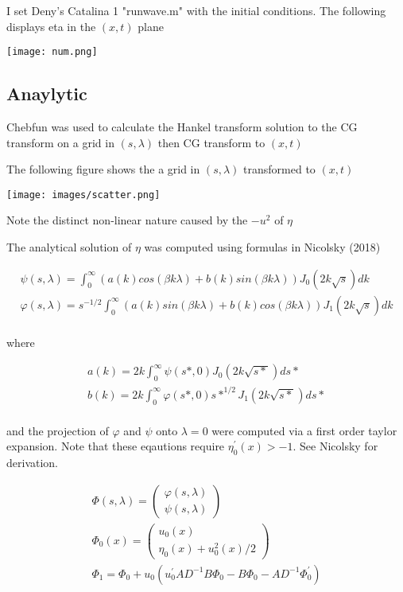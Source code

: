 \documentclass{article}
\begin{document}
I set Deny's Catalina 1 "runwave.m" with the initial conditions. The following displays eta in the $(x,t)$ plane

\texttt{[image: num.png]} 


\subsection{Anaylytic}

Chebfun was used to calculate the Hankel transform solution to the CG transform on a grid in $(s,\lambda)$ then CG transform to $(x,t)$

\noindent The following figure shows the a grid in $(s,\lambda)$ transformed to $(x,t)$

\texttt{[image: images/scatter.png]} 

\noindent Note the distinct non-linear nature caused by the $-u^2$ of $\eta$

\noindent The analytical solution of $\eta$ was computed using formulas in Nicolsky (2018)

\[
\begin{aligned}
\psi (s, \lambda ) = \int_{0}^\infty (a(k)cos(\beta k \lambda)+b(k)sin(\beta k \lambda)) J_0(2 k \sqrt s ) dk\\
\varphi (s, \lambda ) =  s^{-1/2} \int_{0}^\infty (a(k)sin(\beta k \lambda)+b(k)cos(\beta k \lambda)) J_1(2 k \sqrt s )dk \\
\end{aligned}
\]

where

\[
\begin{aligned}
a(k) = 2k \int_{0}^\infty \psi(s*,0) J_0(2 k \sqrt {s*})ds*\\
b(k) = 2k \int_{0}^\infty \varphi(s*,0) s*^{1/2} J_1(2 k \sqrt {s*})ds*\\
\end{aligned}
\]

and the projection of $\varphi$ and $\psi$ onto $\lambda = 0$ were computed via a first order taylor expansion. Note that these eqautions require $\eta_0^\prime(x) > -1$.  See Nicolsky for derivation.

\[
\begin{aligned}
\Phi (s,\lambda) = \begin{pmatrix}
\varphi(s,\lambda) \\
\psi(s,\lambda)
\end{pmatrix} \\
\Phi_0(x) =  \begin{pmatrix}
u_0(x) \\
\eta_0(x) + u_0^2(x)/2
\end{pmatrix} \\
\Phi_1 = \Phi_0 + u_0(u_0^\prime A D^{-1} B \Phi_0 - B \Phi_0 - A D^{-1} \Phi_0^\prime)
\end{aligned}
\]
\end{document}
